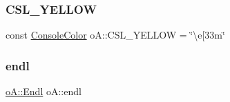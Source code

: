 \mbox{\label{namespaceo_a_a4f2c2032619b23acb3418d4304c3ac9b}} 
\subsubsection{\texorpdfstring{C\+S\+L\+\_\+\+Y\+E\+L\+L\+OW}{CSL\_YELLOW}}
{\footnotesize\ttfamily const \mbox{\hyperlink{namespaceo_a_a747e07c1977a29f3e1d38683043ec927}{Console\+Color}} o\+A\+::\+C\+S\+L\+\_\+\+Y\+E\+L\+L\+OW = \char`\"{}\textbackslash{}e\mbox{[}33m\char`\"{}\hspace{0.3cm}{\ttfamily [inline]}}

\mbox{\label{namespaceo_a_a88943cdf20064b5b85e912d200624c49}} 
\subsubsection{\texorpdfstring{endl}{endl}}
{\footnotesize\ttfamily \mbox{\hyperlink{classo_a_1_1_endl}{o\+A\+::\+Endl}} o\+A\+::endl}

